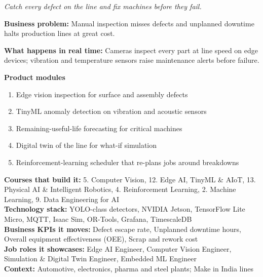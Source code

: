 \documentclass[10pt,a4paper]{article}
\begin{document}
\begin{tcolorbox}[enhanced,breakable,colback=white,colframe=navy,boxrule=0.6pt,arc=2pt,title={\color{goldl}PRODUCT 3 \;|\; MANUFACTURING \& INDUSTRY 4.0\\\color{white}\large Smart Factory Quality \& Predictive Maintenance Suite},colbacktitle=navy,fonttitle=\small\bfseries]
{\small\itshape\color{muted}Catch every defect on the line and fix machines before they fail.}\par
\begin{tcolorbox}[colback=l1bg,colframe=l1bg,arc=2pt,borderline west={3pt}{0pt}{saffron},top=2pt,bottom=2pt]\small\textbf{Business problem:} Manual inspection misses defects and unplanned downtime halts production lines at great cost.\end{tcolorbox}
\begin{tcolorbox}[colback=l3bg,colframe=l3bg,arc=2pt,borderline west={3pt}{0pt}{igreen},top=2pt,bottom=2pt]\small\textbf{What happens in real time:} Cameras inspect every part at line speed on edge devices; vibration and temperature sensors raise maintenance alerts before failure.\end{tcolorbox}
{\small\textbf{Product modules}}\begin{enumerate}\small
\item Edge vision inspection for surface and assembly defects
\item TinyML anomaly detection on vibration and acoustic sensors
\item Remaining-useful-life forecasting for critical machines
\item Digital twin of the line for what-if simulation
\item Reinforcement-learning scheduler that re-plans jobs around breakdowns
\end{enumerate}
{\small\textbf{Courses that build it:} 5. Computer Vision, 12. Edge AI, TinyML \& AIoT, 13. Physical AI \& Intelligent Robotics, 4. Reinforcement Learning, 2. Machine Learning, 9. Data Engineering for AI\\\textbf{Technology stack:} YOLO-class detectors, NVIDIA Jetson, TensorFlow Lite Micro, MQTT, Isaac Sim, OR-Tools, Grafana, TimescaleDB\\\textbf{Business KPIs it moves:} Defect escape rate, Unplanned downtime hours, Overall equipment effectiveness (OEE), Scrap and rework cost\\\textbf{Job roles it showcases:} Edge AI Engineer, Computer Vision Engineer, Simulation \& Digital Twin Engineer, Embedded ML Engineer\\\textbf{Context:} Automotive, electronics, pharma and steel plants; Make in India lines}
\end{tcolorbox}
\end{document}

